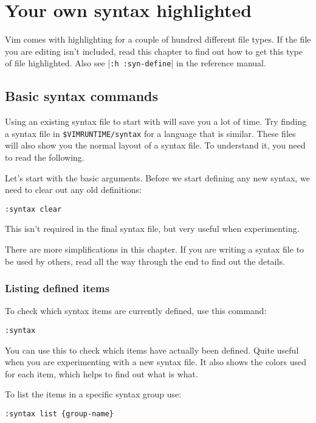 \section{Your own syntax highlighted}
\label{Your own syntax highlighted}
Vim comes with highlighting for a couple of hundred different file types.
If the file you are editing isn't included, read this chapter to find out how to get this type of file highlighted.
Also see |\verb!:h :syn-define!| in the reference manual.
\subsection{Basic syntax commands}
Using an existing syntax file to start with will save you a lot of time.
Try finding a syntax file in \verb!$VIMRUNTIME/syntax! for a language that is similar.
These files will also show you the normal layout of a syntax file.
To understand it, you need to read the following.

Let's start with the basic arguments.
Before we start defining any new syntax, we need to clear out any old definitions:

\begin{Verbatim}[samepage=true]
 :syntax clear
\end{Verbatim}

This isn't required in the final syntax file, but very useful when experimenting.

There are more simplifications in this chapter.
If you are writing a syntax file to be used by others, read all the way through the end to find out the details.

\subsubsection{Listing defined items}
To check which syntax items are currently defined, use this command:

\begin{Verbatim}[samepage=true]
 :syntax
\end{Verbatim}

You can use this to check which items have actually been defined.
Quite useful when you are experimenting with a new syntax file.
It also shows the colors used for each item, which helps to find out what is what.

To list the items in a specific syntax group use:

\begin{Verbatim}[samepage=true]
 :syntax list {group-name}
\end{Verbatim}

